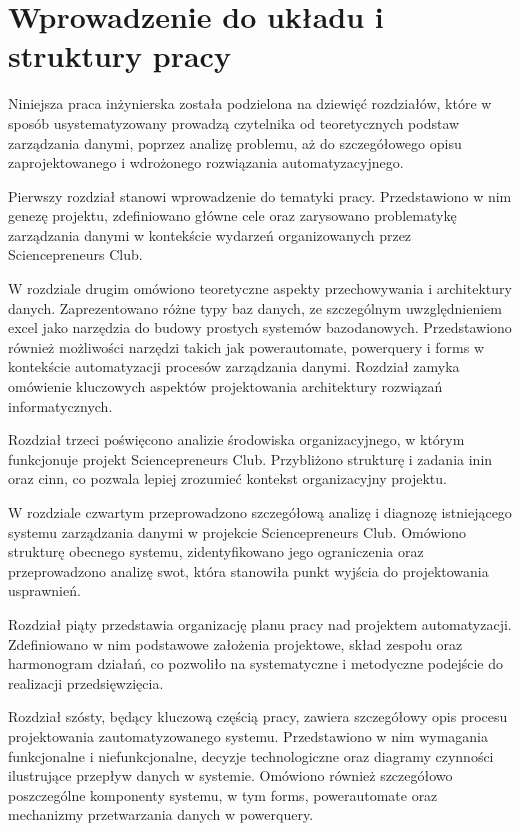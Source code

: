 \section{Wprowadzenie do układu i struktury pracy}
Niniejsza praca inżynierska została podzielona na dziewięć rozdziałów, które w sposób usystematyzowany prowadzą czytelnika od teoretycznych podstaw zarządzania danymi, poprzez analizę problemu, aż do szczegółowego opisu zaprojektowanego i wdrożonego rozwiązania automatyzacyjnego.

Pierwszy rozdział stanowi wprowadzenie do tematyki pracy. Przedstawiono w nim genezę projektu, zdefiniowano główne cele oraz zarysowano problematykę zarządzania danymi w kontekście wydarzeń organizowanych przez Sciencepreneurs Club.

W rozdziale drugim omówiono teoretyczne aspekty przechowywania i architektury danych. Zaprezentowano różne typy baz danych, ze szczególnym uwzględnieniem \gls{excel} jako narzędzia do budowy prostych systemów bazodanowych. Przedstawiono również możliwości narzędzi takich jak \gls{powerautomate}, \gls{powerquery} i \gls{forms} w kontekście automatyzacji procesów zarządzania danymi. Rozdział zamyka omówienie kluczowych aspektów projektowania architektury rozwiązań informatycznych.

Rozdział trzeci poświęcono analizie środowiska organizacyjnego, w którym funkcjonuje projekt Sciencepreneurs Club. Przybliżono strukturę i zadania \gls{inin} oraz \gls{cinn}, co pozwala lepiej zrozumieć kontekst organizacyjny projektu.

W rozdziale czwartym przeprowadzono szczegółową analizę i diagnozę istniejącego systemu zarządzania danymi w projekcie Sciencepreneurs Club. Omówiono strukturę obecnego systemu, zidentyfikowano jego ograniczenia oraz przeprowadzono analizę \gls{swot}, która stanowiła punkt wyjścia do projektowania usprawnień.

Rozdział piąty przedstawia organizację planu pracy nad projektem automatyzacji. Zdefiniowano w nim podstawowe założenia projektowe, skład zespołu oraz harmonogram działań, co pozwoliło na systematyczne i metodyczne podejście do realizacji przedsięwzięcia.

Rozdział szósty, będący kluczową częścią pracy, zawiera szczegółowy opis procesu projektowania zautomatyzowanego systemu. Przedstawiono w nim wymagania funkcjonalne i niefunkcjonalne, decyzje technologiczne oraz diagramy czynności ilustrujące przepływ danych w systemie. Omówiono również szczegółowo poszczególne komponenty systemu, w tym \gls{forms}, \gls{powerautomate} oraz mechanizmy przetwarzania danych w \gls{powerquery}.

